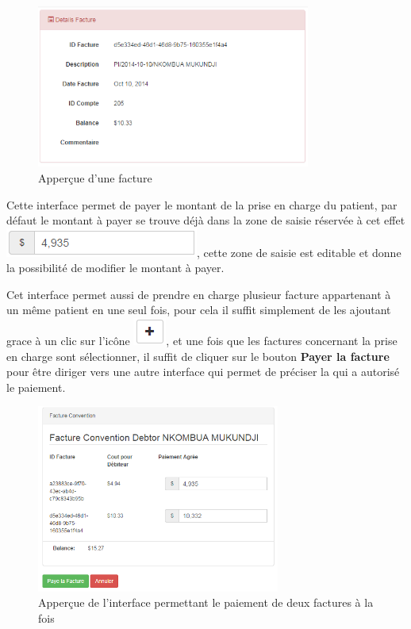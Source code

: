 \documentclass[12pt,a4paper]{report}
\begin{document}
\newpage
\begin{figure}[h]
\begin{center}
\includegraphics[width=9cm]{pic/DetailConv.png}
\end{center}
\caption{Apperçue d'une facture}
\label{Apperçue d'une facture}
\end{figure}


Cette interface permet de payer le montant de la prise en charge du patient, par défaut le montant à payer se trouve déjà dans la zone de saisie réservée à cet effet \includegraphics[scale=0.7]{pic/editableDeb.png}, cette zone de saisie est editable et donne la possibilité de modifier le montant à payer. 

Cet interface permet aussi de prendre en charge plusieur facture appartenant à un même patient en une seul fois, pour cela il suffit simplement de les ajoutant grace à un clic sur l'icône \includegraphics[scale=0.7]{pic/plusBlack.png}, et une fois que les factures concernant la prise en charge sont sélectionner, il suffit de cliquer sur le bouton \textbf{Payer la facture} pour être diriger vers une autre interface qui permet de préciser la qui a autorisé le paiement.

\newpage

\begin{figure}[h]
\begin{center}
\includegraphics[width=8cm]{pic/DoubleConvention.png}
\end{center}
\caption{Apperçue de l'interface permettant le paiement de deux factures à la fois}
\label{Apperçue de l'interface permettant le paiement de deux factures à la fois}
\end{figure}
\end{document}
